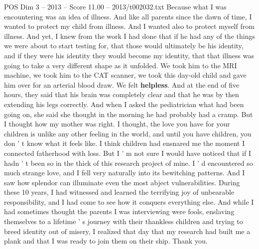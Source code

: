 \begin{textsample}{POS Dim 3 – 2013 – Score 11.00 – 2013/t002032.txt}
Because what I was encountering was an idea of illness.
And like all parents since the dawn of time, I wanted to protect my child from illness.
And I wanted also to protect myself from illness.
And yet, I knew from the work I had done that if he had any of the things we were about to start testing for, that those would ultimately be his identity, and if they were his identity they would become my identity, that that illness was going to take a very different shape as it unfolded.
We took him to the MRI machine, we took him to the CAT scanner, we took this day-old child and gave him over for an arterial blood draw.
We felt \textbf{helpless}.
And at the end of five hours, they said that his brain was completely clear and that he was by then extending his legs correctly.
And when I asked the pediatrician what had been going on, she said she thought in the morning he had probably had a cramp.
But I thought how my mother was right.
I thought, the love you have for your children is unlike any other feeling in the world, and until you have children, you don ' t know what it feels like.
I think children had ensnared me the moment I connected fatherhood with loss.
But I ' m not sure I would have noticed that if I hadn ' t been so in the thick of this research project of mine.
I ' d encountered so much strange love, and I fell very naturally into its bewitching patterns.
And I saw how splendor can illuminate even the most abject vulnerabilities.
During these 10 years, I had witnessed and learned the terrifying joy of unbearable responsibility, and I had come to see how it conquers everything else.
And while I had sometimes thought the parents I was interviewing were fools, enslaving themselves to a lifetime ' s journey with their thankless children and trying to breed identity out of misery, I realized that day that my research had built me a plank and that I was ready to join them on their ship.
Thank you.

\end{textsample}
